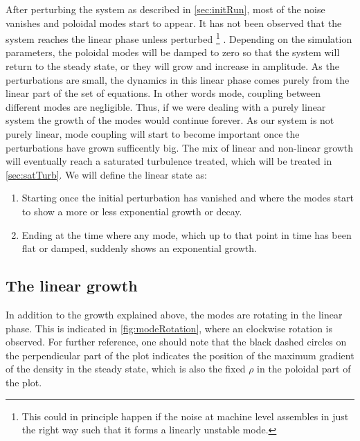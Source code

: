 After perturbing the system as described in \cref{sec:initRun}, most of the noise vanishes and poloidal modes start to appear.
It has not been observed that the system reaches the linear phase unless perturbed%
\footnote{This could in principle happen if the noise at machine level assembles in just the right way such that it forms a linearly unstable mode.}%
%
.
Depending on the simulation parameters, the poloidal modes will be damped to zero so that the system will return to the steady state, or they will grow and increase in amplitude.
As the perturbations are small, the dynamics in this linear phase comes purely from the linear part of the set of equations.
In other words mode, coupling between different modes are negligible.
Thus, if we were dealing with a purely linear system the growth of the modes would continue forever.
As our system is not purely linear, mode coupling will start to become important once the perturbations have grown sufficently big.
The mix of linear and non-linear growth will eventually reach a saturated turbulence treated, which will be treated in \cref{sec:satTurb}.
We will define the linear state as:
%
\begin{enumerate}
    \item Starting once the initial perturbation has vanished and where the modes start to show a more or less exponential growth or decay.
    \item Ending at the time where any mode, which up to that point in time has been flat or damped, suddenly shows an exponential growth.
\end{enumerate}
%

\subsection{The linear growth}
%
In addition to the growth explained above, the modes are rotating in the linear phase.
This is indicated in \cref{fig:modeRotation}, where an clockwise rotation is observed.
For further reference, one should note that the black dashed circles on the perpendicular part of the plot indicates the position of the maximum gradient of the density in the steady state, which is also the fixed $\rho$ in the poloidal part of the plot.

